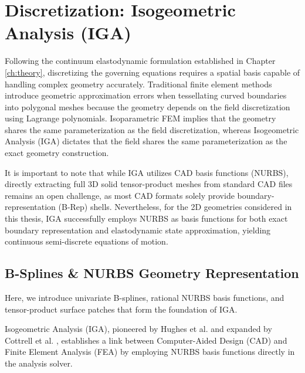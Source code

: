 \chapter{Discretization: Isogeometric Analysis (IGA)}
\label{ch:discretization}


Following the continuum elastodynamic formulation established in Chapter \ref{ch:theory}, discretizing the governing equations requires a spatial basis capable of handling complex geometry accurately. Traditional finite element methods introduce geometric approximation errors when tessellating curved boundaries into polygonal meshes because the geometry depends on the field discretization using Lagrange polynomials. Isoparametric FEM implies that the geometry shares the same parameterization as the field discretization, whereas Isogeometric Analysis (IGA) dictates that the field shares the same parameterization as the exact geometry construction.

It is important to note that while IGA utilizes CAD basis functions (NURBS), directly extracting full 3D solid tensor-product meshes from standard CAD files remains an open challenge, as most CAD formats solely provide boundary-representation (B-Rep) shells. Nevertheless, for the 2D geometries considered in this thesis, IGA successfully employs NURBS as basis functions for both exact boundary representation and elastodynamic state approximation, yielding continuous semi-discrete equations of motion.

\section{B-Splines \& NURBS Geometry Representation}

Here, we introduce univariate B-splines, rational NURBS basis functions, and tensor-product surface patches that form the foundation of IGA.

Isogeometric Analysis (IGA), pioneered by Hughes et al. \cite{hughes2005} and expanded by Cottrell et al. \cite{cottrell2009}, establishes a link between Computer-Aided Design (CAD) and Finite Element Analysis (FEA) by employing NURBS basis functions directly in the analysis solver.

